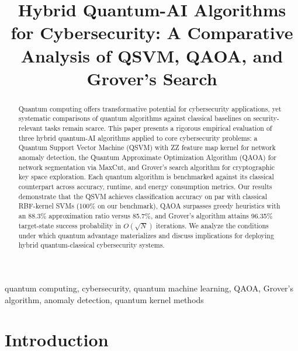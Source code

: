 \documentclass[conference]{IEEEtran}
\begin{document}
\title{Hybrid Quantum-AI Algorithms for Cybersecurity: A Comparative Analysis of QSVM, QAOA, and Grover's Search}

\author{
}

\maketitle

\begin{abstract}
Quantum computing offers transformative potential for cybersecurity applications, yet systematic comparisons of quantum algorithms against classical baselines on security-relevant tasks remain scarce. This paper presents a rigorous empirical evaluation of three hybrid quantum-AI algorithms applied to core cybersecurity problems: a Quantum Support Vector Machine (QSVM) with ZZ feature map kernel for network anomaly detection, the Quantum Approximate Optimization Algorithm (QAOA) for network segmentation via MaxCut, and Grover's search algorithm for cryptographic key space exploration. Each quantum algorithm is benchmarked against its classical counterpart across accuracy, runtime, and energy consumption metrics. Our results demonstrate that the QSVM achieves classification accuracy on par with classical RBF-kernel SVMs (100\% on our benchmark), QAOA surpasses greedy heuristics with an 88.3\% approximation ratio versus 85.7\%, and Grover's algorithm attains 96.35\% target-state success probability in $O(\sqrt{N})$ iterations. We analyze the conditions under which quantum advantage materializes and discuss implications for deploying hybrid quantum-classical cybersecurity systems.
\end{abstract}

\begin{IEEEkeywords}
quantum computing, cybersecurity, quantum machine learning, QAOA, Grover's algorithm, anomaly detection, quantum kernel methods
\end{IEEEkeywords}

\section{Introduction}
\end{document}
